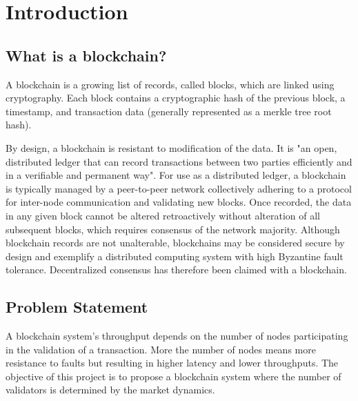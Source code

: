 
\chapter{Introduction} %

\label{Chapter 1} %


\section{What is a blockchain?}



A blockchain is a growing list of records, called blocks, which are linked using cryptography. Each block contains a cryptographic hash of the previous block, a timestamp, and transaction data (generally represented as a merkle tree root hash).

By design, a blockchain is resistant to modification of the data. It is "an open, distributed ledger that can record transactions between two parties efficiently and in a verifiable and permanent way". For use as a distributed ledger, a blockchain is typically managed by a peer-to-peer network collectively adhering to a protocol for inter-node communication and validating new blocks. Once recorded, the data in any given block cannot be altered retroactively without alteration of all subsequent blocks, which requires consensus of the network majority. Although blockchain records are not unalterable, blockchains may be considered secure by design and exemplify a distributed computing system with high Byzantine fault tolerance. Decentralized consensus has therefore been claimed with a blockchain.

\section{Problem Statement}

A blockchain system's throughput depends on the number of nodes participating in the validation of a transaction. More the number of nodes means more resistance to faults but resulting in higher latency and lower throughputs. The objective of this project is to propose a blockchain system where the number of validators is determined by the market dynamics.


